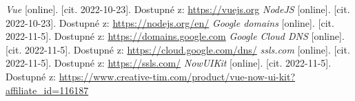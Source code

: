\begin{thebibliography}{99}

  \textit{Vue} [online]. [cit. 2022-10-23]. Dostupné z: \url{https://vuejs.org}
  \textit{NodeJS} [online]. [cit. 2022-10-23]. Dostupné z: \url{https://nodejs.org/en/}
  \textit{Google domains} [online]. [cit. 2022-11-5]. Dostupné z: \url{https://domains.google.com}
  \textit{Google Cloud DNS} [online]. [cit. 2022-11-5]. Dostupné z: \url{https://cloud.google.com/dns/}
  \textit{ssls.com} [online]. [cit. 2022-11-5]. Dostupné z: \url{https://ssls.com/}
  \textit{NowUIKit} [online]. [cit. 2022-11-5]. Dostupné z: \url{https://www.creative-tim.com/product/vue-now-ui-kit?affiliate_id=116187}
  

\end{thebibliography}
